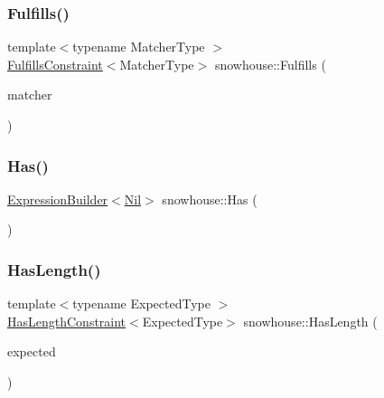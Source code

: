 \mbox{\label{namespacesnowhouse_a776dc7f3d94c1d13eaeed62e7235d026}} 
\subsubsection{\texorpdfstring{Fulfills()}{Fulfills()}}
{\footnotesize\ttfamily template$<$typename Matcher\+Type $>$ \\
\mbox{\hyperlink{structsnowhouse_1_1FulfillsConstraint}{Fulfills\+Constraint}}$<$Matcher\+Type$>$ snowhouse\+::\+Fulfills (\begin{DoxyParamCaption}\item[{const Matcher\+Type \&}]{matcher }\end{DoxyParamCaption})\hspace{0.3cm}{\ttfamily [inline]}}

\mbox{\label{namespacesnowhouse_a6611d88e19c4a79418f43de9647cbbb7}} 
\subsubsection{\texorpdfstring{Has()}{Has()}}
{\footnotesize\ttfamily \mbox{\hyperlink{structsnowhouse_1_1ExpressionBuilder}{Expression\+Builder}}$<$\mbox{\hyperlink{structsnowhouse_1_1Nil}{Nil}}$>$ snowhouse\+::\+Has (\begin{DoxyParamCaption}{ }\end{DoxyParamCaption})\hspace{0.3cm}{\ttfamily [inline]}}

\mbox{\label{namespacesnowhouse_af480379a538a0aac57f15bc8ccf25af5}} 
\subsubsection{\texorpdfstring{HasLength()}{HasLength()}\hspace{0.1cm}{\footnotesize\ttfamily [1/2]}}
{\footnotesize\ttfamily template$<$typename Expected\+Type $>$ \\
\mbox{\hyperlink{structsnowhouse_1_1HasLengthConstraint}{Has\+Length\+Constraint}}$<$Expected\+Type$>$ snowhouse\+::\+Has\+Length (\begin{DoxyParamCaption}\item[{const Expected\+Type \&}]{expected }\end{DoxyParamCaption})\hspace{0.3cm}{\ttfamily [inline]}}

